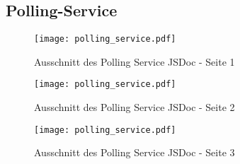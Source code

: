 \subsection{Polling-Service}
\begin{figure}[H]
    \texttt{[image: polling\_service.pdf]}
    \caption*{Ausschnitt des Polling Service JSDoc - Seite 1}
\end{figure}
\begin{figure}[H]
    \texttt{[image: polling\_service.pdf]}
    \caption*{Ausschnitt des Polling Service JSDoc - Seite 2}
\end{figure}
\begin{figure}[H]
    \texttt{[image: polling\_service.pdf]}
    \caption*{Ausschnitt des Polling Service JSDoc - Seite 3}
\end{figure}